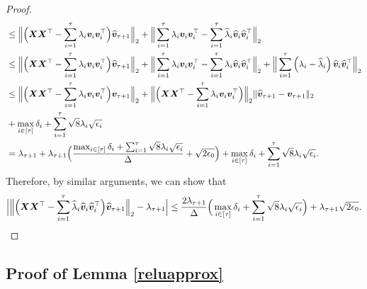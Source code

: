 \begin{proof}
\begin{align*}
        &\leq\Big\Vert\Big(\boldsymbol{X}\boldsymbol{X}^\top-\sum_{i=1}^{\tau}\lambda_i\boldsymbol{v}_i\boldsymbol{v}_i^\top\Big)\widehat{\boldsymbol{v}}_{\tau+1}\Big\Vert_2+\Big\Vert\sum_{i=1}^\tau\lambda_i\boldsymbol{v}_i\boldsymbol{v}_i^\top-\sum_{i=1}^{\tau}\widehat{\lambda}_i\widehat{\boldsymbol{v}}_i\widehat{\boldsymbol{v}}_i^\top \Big\Vert_2\\
        &\leq \Big\Vert\Big(\boldsymbol{X}\boldsymbol{X}^\top-\sum_{i=1}^{\tau}\lambda_i\boldsymbol{v}_i\boldsymbol{v}_i^\top\Big)\widehat{\boldsymbol{v}}_{\tau+1} \Big\Vert_2+\Big\Vert\sum_{i=1}^{\tau}\lambda_i\boldsymbol{v}_i\boldsymbol{v}_i^\top-\sum_{i=1}^{\tau}\lambda_i\widehat{\boldsymbol{v}}_i\widehat{\boldsymbol{v}}_i^\top\Big\Vert_2+\Big\Vert \sum_{i=1}^{\tau}\left(\lambda_i-\widehat{\lambda}_i\right)\widehat{\boldsymbol{v}}_i\widehat{\boldsymbol{v}}_i^\top\Big\Vert_2\\
        &\leq\Big\Vert\Big(\boldsymbol{X}\boldsymbol{X}^\top-\sum_{i=1}^{\tau}\lambda_i\boldsymbol{v}_i\boldsymbol{v}_i^\top\Big)\boldsymbol{v}_{\tau+1}\Big\Vert_2+\Big\Vert\Big(\boldsymbol{X}\boldsymbol{X}^\top-\sum_{i=1}^{\tau}\lambda_i\boldsymbol{v}_i\boldsymbol{v}_i^\top\Big)\Big\Vert_2\Vert\widehat{\boldsymbol{v}}_{\tau+1}-\boldsymbol{v}_{\tau+1}\Vert_2\\
        &+\max_{i\in[\tau]}\delta_i+\sum_{i=1}^{\tau}\sqrt{8}\lambda_i\sqrt{\epsilon_i}\\
        &=\lambda_{\tau+1}+\lambda_{\tau+1}\Big(\frac{\max_{i\in[\tau]}\delta_i+\sum_{i=1}^{\tau}\sqrt 8\lambda_i\sqrt{\epsilon_i}}{\Delta}+\sqrt{2\epsilon_0}\Big)+\max_{i\in[\tau]}\delta_i+\sum_{i=1}^{\tau}\sqrt 8\lambda_i\sqrt{\epsilon_i}.
    \end{align*}
    Therefore, by similar arguments, we can show that
    \begin{align*}
        \Big|\Big\Vert \Big(\boldsymbol{X}\boldsymbol{X}^\top-\sum_{i=1}^{\tau}\widehat{\lambda}_i\widehat{\boldsymbol{v}}_i\widehat{\boldsymbol{v}}_i^\top\Big)\widehat{\boldsymbol{v}}_{\tau+1}\Big\Vert_2-\lambda_{\tau+1}\Big|\leq \frac{2\lambda_{\tau+1}}{\Delta}\Big(\max_{i\in[\tau]}\delta_i+\sum_{i=1}^{\tau}\sqrt{8}\lambda_i\sqrt{\epsilon_i}\Big)+\lambda_{\tau+1}\sqrt{2\epsilon_0}.
    \end{align*}
\end{proof}

\subsection{Proof of Lemma \ref{reluapprox}}


